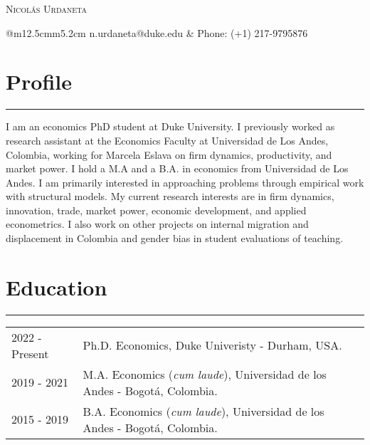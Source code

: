 \documentclass[12pt, letterpaper]{article}
\begin{document}
 

\begin{center}
{\Huge \textsc{Nicolás Urdaneta}}
\vspace*{5mm}

\begin{tabular}{@{}m{12.5cm}m{5.2cm}}
\noindent n.urdaneta@duke.edu & Phone: (+1) 217-9795876 \\
\end{tabular}
\vspace*{-9mm}

\end{center}
\section*{Profile}
\vspace*{-8mm}
\noindent \rule{\linewidth}{0.2mm}
\noindent I am an economics PhD student at Duke University. I previously worked as research assistant at the Economics Faculty at Universidad de Los Andes, Colombia, working for Marcela Eslava on firm dynamics, productivity, and market power. I hold a M.A and a B.A. in economics from Universidad de Los Andes. I am primarily interested in approaching problems through empirical work with structural models. My current research interests are in firm dynamics, innovation, trade, market power, economic development, and applied econometrics. I also work on other projects on internal migration and displacement in Colombia and gender bias in student evaluations of teaching. 

\vspace*{-4mm}

\section*{Education}
\vspace*{-8mm}
\noindent \rule{\linewidth}{0.2mm}
\noindent
\begin{tabular}{@{}p{3cm}p{13.7cm}}
2022 - Present &  Ph.D. Economics, Duke Univeristy - Durham, USA. \\
2019 - 2021 &  M.A. Economics (\textit{cum laude}), Universidad de los Andes - Bogotá, Colombia. \\
2015 - 2019 & B.A. Economics (\textit{cum laude}), Universidad de los Andes - Bogotá, Colombia.
\end{tabular}

\vspace*{-2mm}
\end{document}
